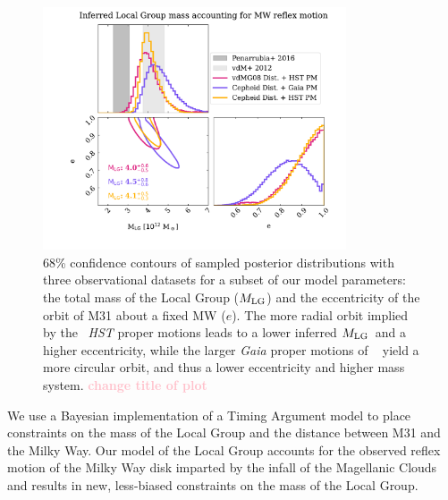 \documentclass[twocolumn]{aastex631}
\newcommand{\kc}[1]{\textcolor{pink}{\textbf{#1}} }
\newcommand{\mlg}{\ensuremath{M_{\rm LG}}}
\begin{document}
\begin{figure}[htb]
  \centering
  \includegraphics[width=0.8\textwidth,trim=1.3cm 0.8cm 1.3cm 0cm,clip=true]
  {analyze-runs-contour.pdf}
  \caption{\label{fig:contour} 68\% confidence contours of sampled posterior
  distributions with three observational datasets for a subset of our model
  parameters: the total mass of the Local Group (\mlg)
  and the eccentricity of the orbit of M31 about a fixed MW ($e$).
  The more radial orbit implied by the~\cite{vdm2012} \textit{HST} proper
  motions leads to a lower inferred \mlg\ and a higher
  eccentricity, while the larger \textit{Gaia} proper motions of
  ~\cite{Salomon2021} yield a more circular orbit, and thus a lower eccentricity
   and higher mass system.
   \kc{change title of plot}
   }
\end{figure}


We use a Bayesian implementation of a Timing Argument model to place constraints
on the mass of the Local Group and the distance between M31 and the Milky Way.
Our model of the Local Group accounts for the observed reflex motion of 
the Milky Way
disk imparted by the infall of the Magellanic Clouds and results in new,
less-biased constraints on the mass of the Local Group.
\end{document}
